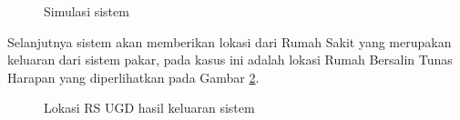 \begin{figure}[h]	
	{\par}
	\caption{Simulasi sistem}
	\label{fig:simulasi}
\end{figure}
\par
Selanjutnya sistem akan memberikan lokasi dari Rumah Sakit yang merupakan keluaran dari sistem pakar, pada kasus ini adalah lokasi Rumah Bersalin Tunas Harapan yang diperlihatkan pada Gambar \ref{fig:hasil}. 
\begin{figure}[h]	
	{\centering {}\par}
	\caption{Lokasi RS UGD hasil keluaran sistem}
	\label{fig:hasil}
\end{figure}

